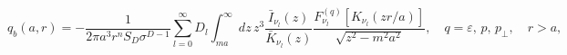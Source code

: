 \begin{equation}
q_{b}(a,r)=-\frac{1}{2\pi a^{3}r^{n}S_{D}\sigma
^{D-1}}\sum_{l=0}^{\infty
}D_{l}\int_{ma}^{\infty }dz\,z^{3}\frac{\bar{I}_{\nu _{l} }(z)}{\bar{K}_{\nu _{l} }(z)}%
\frac{F_{\nu _{l} }^{(q)}\left[ K_{\nu _{l} }(zr/a)\right] }{\sqrt{z^{2}-m^{2}a^{2}}}%
,\quad q=\varepsilon ,\,p,\,p_{\perp },\quad r>a,  \label{q1out}
\end{equation}

